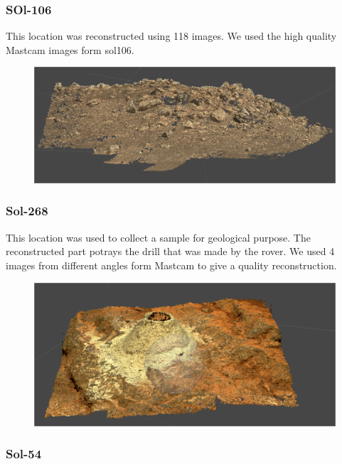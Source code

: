 \subsubsection{SOl-106}

This location was reconstructed using 118 images. We used the high quality Mastcam images form sol106.

\begin{figure}[H]
	\centering
	\includegraphics[scale=0.3]{img/sol106pc.png}
	\label{fig:sol103}
	\caption{}
\end{figure}

\subsubsection{Sol-268}
\label{sec:drilluncal}

This location was used to collect a sample for geological purpose. The reconstructed part potrays the drill that was made by the rover. We used 4 images from different angles form Mastcam to give a quality reconstruction.

\begin{figure}[H]
	\centering
	\includegraphics[scale=0.3]{img/sol286.png}
	\label{fig:sol268}
	\caption{}
\end{figure}

\subsubsection{Sol-54}
\label{sec:sol54}

